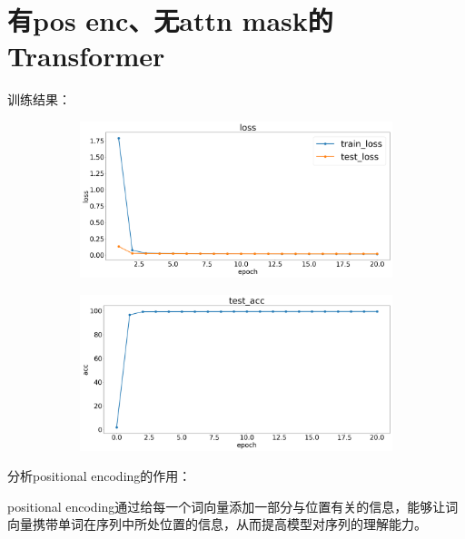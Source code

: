 \documentclass[11pt, a4paper]{article}
\begin{document}
\section{有pos enc、无attn mask的Transformer}
训练结果：
\begin{figure}[H]
    \hfill
    \begin{subfigure}[t]{0.45\linewidth}
        \includegraphics[width=\textwidth]{img/4-1.png}
    \end{subfigure}
    \hfill
    \begin{subfigure}[t]{0.45\linewidth}
        \includegraphics[width=\textwidth]{img/4-2.png}
    \end{subfigure}
    \hfill
\end{figure}


分析positional encoding的作用：

positional encoding通过给每一个词向量添加一部分与位置有关的信息，能够让词向量携带单词在序列中所处位置的信息，从而提高模型对序列的理解能力。
\end{document}

